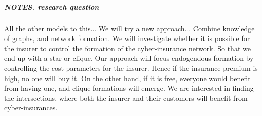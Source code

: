 \subparagraph{NOTES. research question}
All the other models to this...
We will try a new approach...
Combine knowledge of graphs, and network formation. We will investigate whether it is possible for the insurer to control the formation of the cyber-insurance network. So that we end up with a star or clique. Our approach will focus endogendous formation by controlling the cost parameters for the insurer. Hence if the insurance premium is high, no one will buy it. On the other hand, if it is free, everyone would benefit from having one, and clique formations will emerge. We are interested in finding the intersections, where both the insurer and their customers will benefit from cyber-insurances. 

